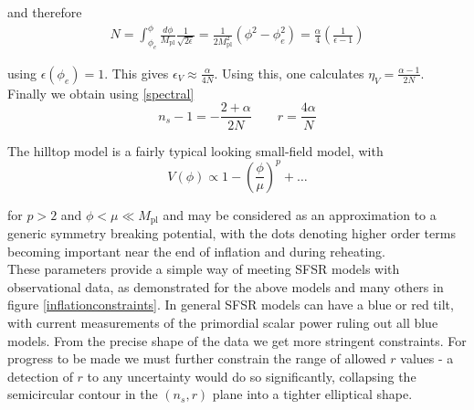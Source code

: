 \documentclass[a4paper,10pt]{article}
\newcommand{\Mp}{M_{\text{pl}}}
\begin{document}
and therefore
\begin{equation}
\begin{split}
N = \int_{\phi_e}^\phi \frac{d\phi}{\Mp}\frac{1}{\sqrt{2\epsilon}} 
= \frac{1}{2\Mp^2}(\phi^2-\phi^2_e)
= \frac{\alpha}{4}\left(\frac{1}{\epsilon-1}\right)
\end{split}
\end{equation}

using $\epsilon(\phi_e)=1$. This gives $\epsilon_V \approx \frac{\alpha}{4N}$. Using this, one calculates $\eta_V=\frac{\alpha-1}{2N}$. Finally we obtain using \ref{spectral} 
\begin{equation}
n_s-1 = -\frac{2+\alpha}{2N} \qquad r=\frac{4\alpha}{N}
\end{equation}


The hilltop model is a fairly typical looking small-field model, with
\begin{equation}
V(\phi) \propto 1-\left(\frac{\phi}{\mu}\right)^p + \ldots 
\end{equation}

for $p>2$ and $\phi<\mu \ll \Mp$ and may be considered as an approximation to a generic symmetry breaking potential, with the dots denoting higher order terms becoming important near the end of inflation and during reheating. \\

These parameters provide a simple way of meeting SFSR models with observational data, as demonstrated for the above models and many others in figure \ref{inflationconstraints}. In general SFSR models can have a blue or red tilt, with current measurements of the primordial scalar power ruling out all blue models. From the precise shape of the data we get more stringent constraints. For progress to be made we must further constrain the range of allowed $r$ values - a detection of $r$ to any uncertainty would do so significantly, collapsing the semicircular contour in the $(n_s,r)$ plane into a tighter elliptical shape.\\
\end{document}
